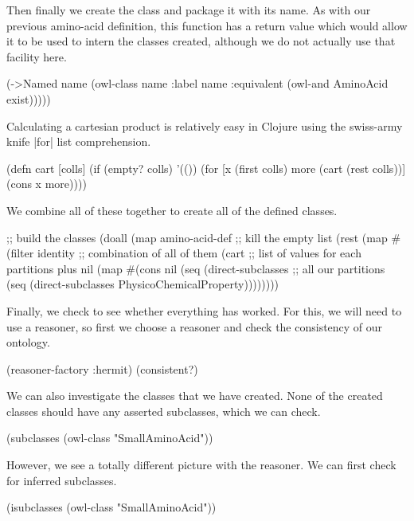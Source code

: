 Then finally we create the class and package it with its name. As with our
previous amino-acid definition, this function has a return value which would
allow it to be used to intern the classes created, although we do not actually
use that facility here.

\begin{tawny}
    (->Named
     name
     (owl-class
      name
      :label name
      :equivalent
      (owl-and AminoAcid exist)))))
\end{tawny}

Calculating a cartesian product is relatively easy in Clojure using the
swiss-army knife |for| list comprehension.

\begin{tawny}
(defn cart [colls]
  (if (empty? colls)
    '(())
    (for [x (first colls)
          more (cart (rest colls))]
      (cons x more))))
\end{tawny}

We combine all of these together to create all of the defined classes.

\begin{tawny}
;; build the classes
(doall
 (map
  amino-acid-def
  ;; kill the empty list
  (rest
   (map
    #(filter identity %
    ;; combination of all of them
    (cart
     ;; list of values for each partitions plus nil
     (map
      #(cons nil (seq (direct-subclasses %
      ;; all our partitions
      (seq (direct-subclasses PhysicoChemicalProperty))))))))
\end{tawny}

Finally, we check to see whether everything has worked. For this, we will need
to use a reasoner, so first we choose a reasoner and check the consistency of
our ontology.

\begin{tawny}
(reasoner-factory :hermit)
(consistent?)
\end{tawny}

We can also investigate the classes that we have created. None of the created classes
should have any asserted subclasses, which we can check.

\begin{tawny}
(subclasses
 (owl-class "SmallAminoAcid"))
\end{tawny}

However, we see a totally different picture with the reasoner. We can first
check for inferred subclasses.

\begin{tawny}
(isubclasses
 (owl-class "SmallAminoAcid"))
\end{tawny}

